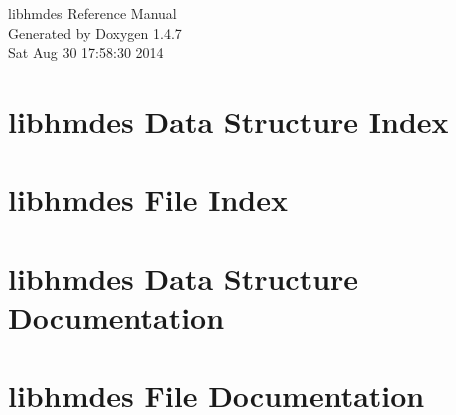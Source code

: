 \documentclass[letterpaper]{book}
\begin{document}
\begin{titlepage}
\vspace*{7cm}
\begin{center}
{\Large libhmdes Reference Manual}\\
\vspace*{1cm}
{\large Generated by Doxygen 1.4.7}\\
\vspace*{0.5cm}
{\small Sat Aug 30 17:58:30 2014}\\
\end{center}
\end{titlepage}
\clearemptydoublepage
{}
\tableofcontents
\clearemptydoublepage
{}
\chapter{libhmdes Data Structure Index}

\chapter{libhmdes File Index}

\chapter{libhmdes Data Structure Documentation}























\chapter{libhmdes File Documentation}



\printindex
\end{document}
